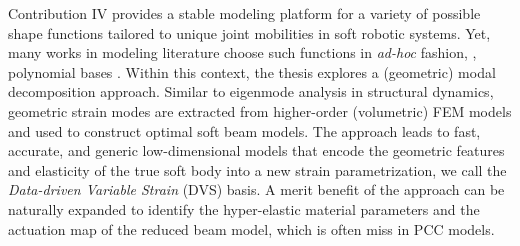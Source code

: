 Contribution IV provides a stable modeling platform for a variety of possible shape functions tailored to unique joint mobilities in soft robotic systems. Yet, many works in modeling literature choose such functions in \textit{ad-hoc} fashion, \eg, polynomial bases \cite{DellaSantina2020,Boyer2021,Chirikjian1991}. Within this context, the thesis explores a (geometric) modal decomposition approach. Similar to eigenmode analysis in structural dynamics, geometric strain modes are extracted from higher-order (volumetric) FEM models and used to construct optimal soft beam models. The approach leads to fast, accurate, and generic low-dimensional models that encode the geometric features and elasticity of the true soft body into a new strain parametrization,  we call the \textit{Data-driven Variable Strain} (DVS) basis. A merit benefit of the approach can be naturally expanded to identify the hyper-elastic material parameters and the actuation map of the reduced beam model, which is often miss in PCC models. %
 


